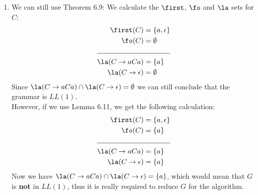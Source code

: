 \begin{solution}
\begin{enumerate}
\item We can still use Theorem 6.9: We calculate the $\first$, $\fo$ and $\la$ sets for $C$:
    \begin{align*}
        \first(C) &= \{ a, \epsilon \}\\
        \fo(C) &= \emptyset\\
        \cline{1-2}
        \la(C \rightarrow a C a) &= \{ a \}\\
        \la(C \rightarrow \epsilon) &= \emptyset
    \end{align*}
    Since $\la(C \rightarrow a C a) \cap \la(C \rightarrow \epsilon) = \emptyset$ we can still conclude that the grammar is $LL(1)$.\\
    However, if we use Lemma 6.11, we get the following calculation:
        \begin{align*}
        \first(C) &= \{ a, \epsilon \}\\
        \fo(C) &= \{ a \}\\
        \cline{1-2}
        \la(C \rightarrow a C a) &= \{ a \}\\
        \la(C \rightarrow \epsilon) &= \{ a \}
    \end{align*}
    Now we have $\la(C \rightarrow a C a) \cap \la(C \rightarrow \epsilon) = \{ a \}$, which would mean that $G$ is \textbf{not} in $LL(1)$, thus it is really required to reduce $G$ for the algorithm.
\end{enumerate}
\end{solution}

